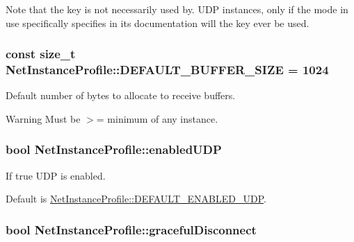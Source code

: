 Note that the key is not necessarily used by. UDP instances, only if the mode in use specifically specifies in its documentation will the key ever be used. \hypertarget{class_net_instance_profile_a285d88534b9936cc603e778aa70d8ec3}{
\subsubsection[{DEFAULT\_\-BUFFER\_\-SIZE}]{\setlength{\rightskip}{0pt plus 5cm}const size\_\-t {\bf NetInstanceProfile::DEFAULT\_\-BUFFER\_\-SIZE} = 1024}}
\label{class_net_instance_profile_a285d88534b9936cc603e778aa70d8ec3}


Default number of bytes to allocate to receive buffers. 

\begin{DoxyWarning}{Warning}
Must be $>$= minimum of any instance. 
\end{DoxyWarning}
\hypertarget{class_net_instance_profile_add7906378b2fe3ebc0fed461b0e02395}{
\subsubsection[{enabledUDP}]{\setlength{\rightskip}{0pt plus 5cm}bool {\bf NetInstanceProfile::enabledUDP}}}
\label{class_net_instance_profile_add7906378b2fe3ebc0fed461b0e02395}


If true UDP is enabled. 

Default is \hyperlink{class_net_instance_profile_aceaa7353038094829951787fcb7ce2b8}{NetInstanceProfile::DEFAULT\_\-ENABLED\_\-UDP}. \hypertarget{class_net_instance_profile_a73dbd928100dce63697399d8e21058eb}{
\subsubsection[{gracefulDisconnect}]{\setlength{\rightskip}{0pt plus 5cm}bool {\bf NetInstanceProfile::gracefulDisconnect}}}
\label{class_net_instance_profile_a73dbd928100dce63697399d8e21058eb}


